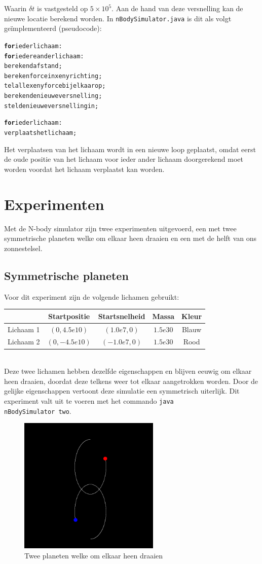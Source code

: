\documentclass[12pt]{article}
\begin{document}
Waarin ${\delta}t$ is vastgesteld op $5 \times 10^5$. Aan de hand van deze versnelling kan de nieuwe locatie berekend worden. In \verb|nBodySimulator.java| is dit als volgt ge\"implementeerd (pseudocode):
\begin{alltt}
\textbf{for} ieder lichaam:
    \textbf{for} iedere ander lichaam:
        berekend afstand;
        bereken force in x en y richting;
    tel alle x en y force bij elkaar op;
    bereken de nieuwe versnelling;
    stel de nieuwe versnelling in;

\textbf{for} ieder lichaam:
    verplaats het lichaam;
\end{alltt}
Het verplaatsen van het lichaam wordt in een nieuwe loop geplaatst, omdat eerst de oude positie van het lichaam voor ieder ander lichaam doorgerekend moet worden voordat het lichaam verplaatst kan worden.
\clearpage
\section{Experimenten}
Met de N-body simulator zijn twee experimenten uitgevoerd, een met twee symmetrische planeten welke om elkaar heen draaien en een met de helft van ons zonnestelsel.
\subsection{Symmetrische planeten}
Voor dit experiment zijn de volgende lichamen gebruikt: \\[0.2cm]
\begin{tabular}{| l | c | c | c | c |}
	\hline
	& Startpositie & Startsnelheid & Massa & Kleur \\
	\hline
	Lichaam 1 & $(0, 4.5e10)$ & $(1.0e7, 0)$ & $1.5e30$ & Blauw \\
	\hline
	Lichaam 2 & $(0, -4.5e10)$ & $(-1.0e7, 0)$ & $1.5e30$ & Rood \\
	\hline
\end{tabular} \\[0.2cm]
Deze twee lichamen hebben dezelfde eigenschappen en blijven eeuwig om elkaar heen draaien, doordat deze telkens weer tot elkaar aangetrokken worden. Door de gelijke eigenschappen vertoont deze simulatie een symmetrisch uiterlijk. Dit experiment valt uit te voeren met het commando \verb|java | \\
\verb|nBodySimulator two|.
\begin{figure}[h!]
	\centering
	\includegraphics[width=0.6\textwidth]{2plan.png}
	\caption{Twee planeten welke om elkaar heen draaien}
	\label{twee}
\end{figure}
\end{document}
